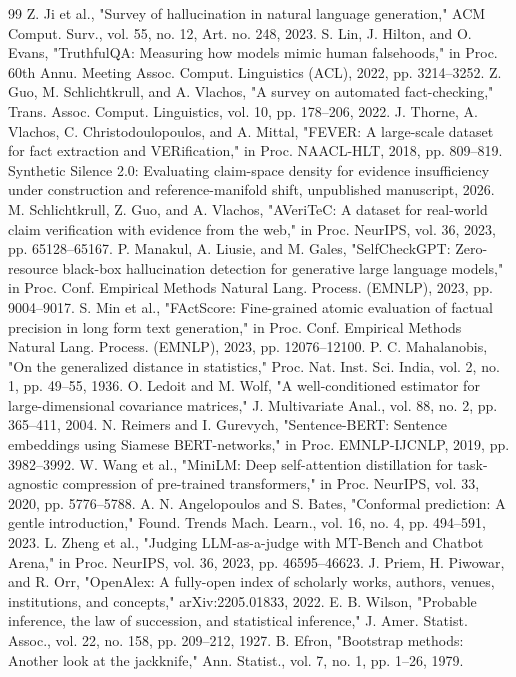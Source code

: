 \documentclass[conference]{IEEEtran}
\begin{document}
\begin{thebibliography}{99}
 Z. Ji et al., "Survey of hallucination in natural language generation," ACM Comput. Surv., vol. 55, no. 12, Art. no. 248, 2023.
 S. Lin, J. Hilton, and O. Evans, "TruthfulQA: Measuring how models mimic human falsehoods," in Proc. 60th Annu. Meeting Assoc. Comput. Linguistics (ACL), 2022, pp. 3214--3252.
 Z. Guo, M. Schlichtkrull, and A. Vlachos, "A survey on automated fact-checking," Trans. Assoc. Comput. Linguistics, vol. 10, pp. 178--206, 2022.
 J. Thorne, A. Vlachos, C. Christodoulopoulos, and A. Mittal, "FEVER: A large-scale dataset for fact extraction and VERification," in Proc. NAACL-HLT, 2018, pp. 809--819.
 Synthetic Silence 2.0: Evaluating claim-space density for evidence insufficiency under construction and reference-manifold shift, unpublished manuscript, 2026.
 M. Schlichtkrull, Z. Guo, and A. Vlachos, "AVeriTeC: A dataset for real-world claim verification with evidence from the web," in Proc. NeurIPS, vol. 36, 2023, pp. 65128--65167.
 P. Manakul, A. Liusie, and M. Gales, "SelfCheckGPT: Zero-resource black-box hallucination detection for generative large language models," in Proc. Conf. Empirical Methods Natural Lang. Process. (EMNLP), 2023, pp. 9004--9017.
 S. Min et al., "FActScore: Fine-grained atomic evaluation of factual precision in long form text generation," in Proc. Conf. Empirical Methods Natural Lang. Process. (EMNLP), 2023, pp. 12076--12100.
 P. C. Mahalanobis, "On the generalized distance in statistics," Proc. Nat. Inst. Sci. India, vol. 2, no. 1, pp. 49--55, 1936.
 O. Ledoit and M. Wolf, "A well-conditioned estimator for large-dimensional covariance matrices," J. Multivariate Anal., vol. 88, no. 2, pp. 365--411, 2004.
 N. Reimers and I. Gurevych, "Sentence-BERT: Sentence embeddings using Siamese BERT-networks," in Proc. EMNLP-IJCNLP, 2019, pp. 3982--3992.
 W. Wang et al., "MiniLM: Deep self-attention distillation for task-agnostic compression of pre-trained transformers," in Proc. NeurIPS, vol. 33, 2020, pp. 5776--5788.
 A. N. Angelopoulos and S. Bates, "Conformal prediction: A gentle introduction," Found. Trends Mach. Learn., vol. 16, no. 4, pp. 494--591, 2023.
 L. Zheng et al., "Judging LLM-as-a-judge with MT-Bench and Chatbot Arena," in Proc. NeurIPS, vol. 36, 2023, pp. 46595--46623.
 J. Priem, H. Piwowar, and R. Orr, "OpenAlex: A fully-open index of scholarly works, authors, venues, institutions, and concepts," arXiv:2205.01833, 2022.
 E. B. Wilson, "Probable inference, the law of succession, and statistical inference," J. Amer. Statist. Assoc., vol. 22, no. 158, pp. 209--212, 1927.
 B. Efron, "Bootstrap methods: Another look at the jackknife," Ann. Statist., vol. 7, no. 1, pp. 1--26, 1979.
\end{thebibliography}
\end{document}
